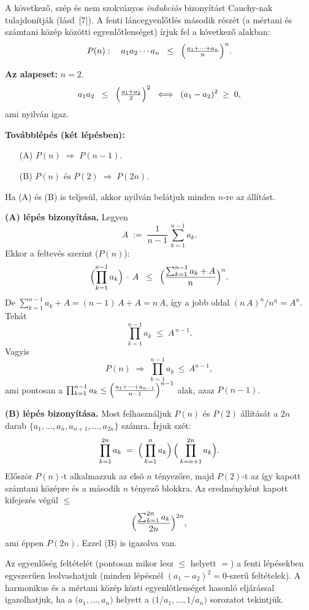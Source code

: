 \begin{solution}
A következő, szép és nem szokványos \emph{indukciós} bizonyítást Cauchy-nak
tulajdonítják (lásd~{[}7{]}). A fenti láncegyenlőtlés második részét
(a mértani és számtani közép közötti egyenlőtlenséget) írjuk fel a
következő alakban: 
\[
P(n):\quad a_{1}a_{2}\cdots a_{n}\;\;\le\;\;\Bigl(\tfrac{a_{1}+\cdots+a_{n}}{n}\Bigr)^{n}.
\]

\medskip{}

\noindent\textbf{Az alapeset:} $n=2$. 
\[
a_{1}a_{2}\;\;\le\;\;\Bigl(\tfrac{a_{1}+a_{2}}{2}\Bigr)^{2}\;\;\Longleftrightarrow\;\;(a_{1}-a_{2})^{2}\;\ge\;0,
\]
ami nyilván igaz.

\medskip{}

\noindent\textbf{Továbblépés (két lépésben):} 
\begin{itemize}
\item[(A)] $P(n)\;\Longrightarrow\;P(n-1).$ 
\item[(B)] $P(n)\text{ és }P(2)\;\Longrightarrow\;P(2n).$ 
\end{itemize}
Ha (A) és (B) is teljesül, akkor nyilván belátjuk minden $n$-re az
állítást.

\medskip{}

\noindent\textbf{(A) lépés bizonyítása.} Legyen 
\[
A\;:=\;\frac{1}{n-1}\,\sum_{k=1}^{n-1}a_{k}.
\]
Ekkor a feltevés szerint ($P(n)$): 
\[
\Bigl(\prod_{k=1}^{n-1}a_{k}\Bigr)\,\cdot\,A\;\;\le\;\;\Bigl(\frac{\sum_{k=1}^{n-1}a_{k}+A}{n}\Bigr)^{n}.
\]
De $\sum_{k=1}^{n-1}a_{k}+A=(n-1)\,A+A=n\,A$, így a jobb oldal $(n\,A)^{n}/n^{n}=A^{n}$.
Tehát 
\[
\prod_{k=1}^{n-1}a_{k}\;\le\;A^{\,n-1}.
\]
Vagyis 
\[
P(n)\;\Longrightarrow\;\prod_{k=1}^{n-1}a_{k}\,\le\,A^{n-1},
\]
ami pontosan a $\prod_{k=1}^{n-1}a_{k}\le\Bigl(\frac{a_{1}+\cdots+a_{n-1}}{n-1}\Bigr)^{n-1}$
alak, azaz $P(n-1)$.

\medskip{}

\noindent\textbf{(B) lépés bizonyítása.} Most felhasználjuk $P(n)$
és $P(2)$ állítását a $2n$ darab $\{a_{1},\dots,a_{n},a_{n+1},\dots,a_{2n}\}$
számra. Írjuk szét: 
\[
\prod_{k=1}^{2n}a_{k}\;=\;\Bigl(\,\prod_{k=1}^{n}a_{k}\Bigr)\,\Bigl(\,\prod_{k=n+1}^{2n}a_{k}\Bigr).
\]
Először $P(n)$-t alkalmazzuk az elsõ $n$ tényezőre, majd $P(2)$-t
az így kapott számtani középre és a második $n$ tényező blokkra.
Az eredményként kapott kifejezés végül $\le$ 
\[
\Bigl(\frac{\sum_{k=1}^{2n}a_{k}}{2n}\Bigr)^{2n},
\]
ami éppen $P(2n)$. Ezzel (B) is igazolva van.

\medskip{}

\noindent Az egyenlőség feltételét (pontosan mikor lesz $\le$ helyett
$=$) a fenti lépésekben egyszerűen leolvashatjuk (minden lépésnél
$(a_{1}-a_{2})^{2}=0$-szerű feltételek). A harmonikus és a mértani
közép közti egyenlőtlenséget hasonló eljárással igazolhatjuk, ha a
$\bigl(a_{1},\dots,a_{n}\bigr)$ helyett a $\bigl(1/a_{1},\dots,1/a_{n}\bigr)$
sorozatot tekintjük. 
\end{solution}
